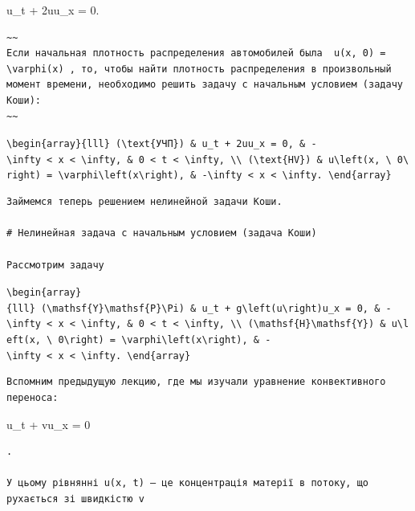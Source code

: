 \documentclass[
  ukrainian,
]{article}
\begin{document}
u\_t + 2uu\_x = 0.

\begin{verbatim}
~~
Если начальная плотность распределения автомобилей была  u(x, 0) = \varphi(x) , то, чтобы найти плотность распределения в произвольный момент времени, необходимо решить задачу с начальным условием (задачу Коши):
~~
\end{verbatim}

\texttt{\textbackslash{}begin\{array\}\{lll\}\ (\textbackslash{}text\{УЧП\})\ \&\ u\_t\ +\ 2uu\_x\ =\ 0,\ \&\ -\textbackslash{}infty\ \textless{}\ x\ \textless{}\ \textbackslash{}infty,\ \&\ 0\ \textless{}\ t\ \textless{}\ \textbackslash{}infty,\ \textbackslash{}\textbackslash{}\ (\textbackslash{}text\{HV\})\ \&\ u\textbackslash{}left(x,\ \textbackslash{}\ 0\textbackslash{}right)\ =\ \textbackslash{}varphi\textbackslash{}left(x\textbackslash{}right),\ \&\ -\textbackslash{}infty\ \textless{}\ x\ \textless{}\ \textbackslash{}infty.\ \textbackslash{}end\{array\}}

\begin{verbatim}
Займемся теперь решением нелинейной задачи Коши.

# Нелинейная задача с начальным условием (задача Коши)

Рассмотрим задачу
\end{verbatim}

\texttt{\textbackslash{}begin\{array\}\{lll\}\ (\textbackslash{}mathsf\{Y\}\textbackslash{}mathsf\{P\}\textbackslash{}Pi)\ \&\ u\_t\ +\ g\textbackslash{}left(u\textbackslash{}right)u\_x\ =\ 0,\ \&\ -\textbackslash{}infty\ \textless{}\ x\ \textless{}\ \textbackslash{}infty,\ \&\ 0\ \textless{}\ t\ \textless{}\ \textbackslash{}infty,\ \textbackslash{}\textbackslash{}\ (\textbackslash{}mathsf\{H\}\textbackslash{}mathsf\{Y\})\ \&\ u\textbackslash{}left(x,\ \textbackslash{}\ 0\textbackslash{}right)\ =\ \textbackslash{}varphi\textbackslash{}left(x\textbackslash{}right),\ \&\ -\textbackslash{}infty\ \textless{}\ x\ \textless{}\ \textbackslash{}infty.\ \textbackslash{}end\{array\}}

\begin{verbatim}
Вспомним предыдущую лекцию, где мы изучали уравнение конвективного переноса:
\end{verbatim}

u\_t + vu\_x = 0

\begin{verbatim}
.

У цьому рівнянні u(x, t) — це концентрація матерії в потоку, що рухається зі швидкістю v
\end{verbatim}
\end{document}
